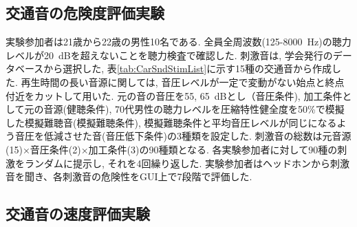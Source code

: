 \documentclass[10pt,twocolumn,uplatex,dvipdfmx]{jsarticle} %
\begin{document}
\subsection{交通音の危険度評価実験}\label{danger_Exp}


実験参加者は21歳から22歳の男性10名である. 全員全周波数(125-8000~Hz)の聴力レベルが20~dBを超えないことを聴力検査で確認した.  刺激音は, 学会発行のデータベース\cite{日本建築学会2004建築と環境のサウンドライブラリ}から選択した, 表\ref{tab:CarSndStimList}に示す15種の交通音から作成した. 再生時間の長い音源に関しては, 音圧レベルが一定で変動がない始点と終点付近をカットして用いた. 元の音の音圧を55, 65~dBとし（音圧条件), 加工条件として元の音源(健聴条件), 70代男性の聴力レベル\cite{iso1984acoustics}を圧縮特性健全度を50\%で模擬した模擬難聴音(模擬難聴条件), 模擬難聴条件と平均音圧レベルが同じになるよう音圧を低減させた音(音圧低下条件)の3種類を設定した.
刺激音の総数は元音源(15)×音圧条件(2)×加工条件(3)の90種類となる. 各実験参加者に対して90種の刺激をランダムに提示し, それを4回繰り返した. 実験参加者はヘッドホンから刺激音を聞き、各刺激音の危険性をGUI上で7段階で評価した.

\subsection{交通音の速度評価実験}
\end{document}
